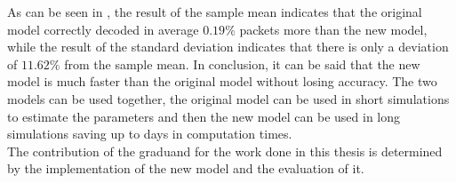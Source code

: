 As can be seen in , the result of the sample mean indicates that the original model correctly decoded in average $0.19\%$ packets more than the new model, while the result of the standard deviation indicates that there is only a deviation of $11.62\%$ from the sample mean.
In conclusion, it can be said that the new model is much faster than the original model without losing accuracy. The two models can be used together, the original model can be used in short simulations to estimate the parameters and then the new model can be used in long simulations saving up to days in computation times.\\
The contribution of the graduand for the work done in this thesis is determined by the implementation of the new model and the evaluation of it.
\newpage
